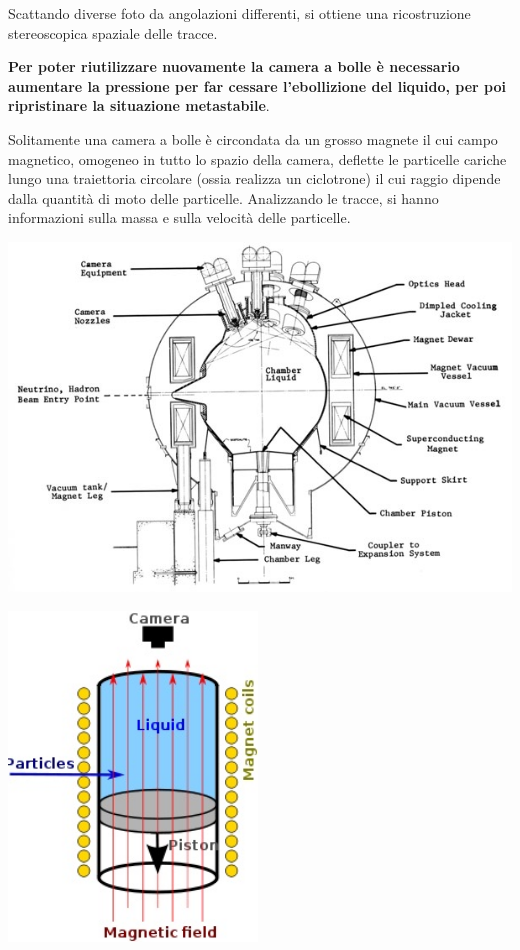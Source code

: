 \documentclass[a4paper,11pt,twoside,openany]{book}
\theoremstyle{definition}
\theoremstyle{plain}
\theoremstyle{plain}
\theoremstyle{definition}
\begin{document}
Scattando diverse foto da angolazioni differenti, si ottiene una ricostruzione stereoscopica spaziale delle tracce.

\textbf{Per poter riutilizzare nuovamente la camera a bolle è necessario aumentare la pressione per far cessare l’ebollizione del liquido, per poi ripristinare la situazione metastabile}.

Solitamente una camera a bolle è circondata da un grosso magnete il cui campo magnetico, omogeneo in tutto lo spazio della camera, deflette le particelle cariche lungo una traiettoria circolare (ossia realizza un ciclotrone) il cui raggio dipende dalla quantità di moto delle particelle. Analizzando le tracce, si hanno informazioni sulla massa e sulla velocità delle particelle.

\begin{center}
\includegraphics[width=\textwidth]{immagini/bolle.jpg} %
\end{center}

\begin{center}
\includegraphics[width=2.6in]{immagini/camera_bolle.jpg} %
\end{center}
\end{document}

